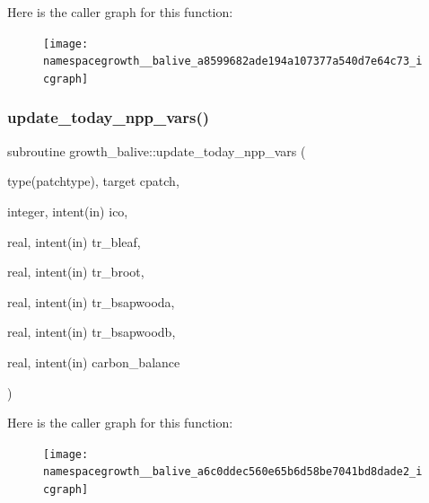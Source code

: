 Here is the caller graph for this function\+:
\nopagebreak
\begin{figure}[H]
\begin{center}
\leavevmode
\texttt{[image: namespacegrowth\_\_balive\_a8599682ade194a107377a540d7e64c73\_icgraph]}
\end{center}
\end{figure}
\mbox{\label{namespacegrowth__balive_a6c0ddec560e65b6d58be7041bd8dade2}} 
\subsubsection{\texorpdfstring{update\+\_\+today\+\_\+npp\+\_\+vars()}{update\_today\_npp\_vars()}}
{\footnotesize\ttfamily subroutine growth\+\_\+balive\+::update\+\_\+today\+\_\+npp\+\_\+vars (\begin{DoxyParamCaption}\item[{type(patchtype), target}]{cpatch,  }\item[{integer, intent(in)}]{ico,  }\item[{real, intent(in)}]{tr\+\_\+bleaf,  }\item[{real, intent(in)}]{tr\+\_\+broot,  }\item[{real, intent(in)}]{tr\+\_\+bsapwooda,  }\item[{real, intent(in)}]{tr\+\_\+bsapwoodb,  }\item[{real, intent(in)}]{carbon\+\_\+balance }\end{DoxyParamCaption})}

Here is the caller graph for this function\+:
\nopagebreak
\begin{figure}[H]
\begin{center}
\leavevmode
\texttt{[image: namespacegrowth\_\_balive\_a6c0ddec560e65b6d58be7041bd8dade2\_icgraph]}
\end{center}
\end{figure}
